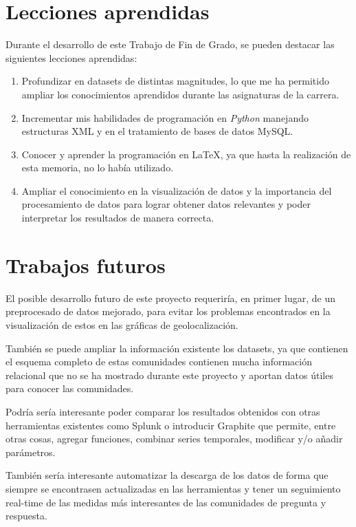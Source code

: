 \documentclass[a4paper, 12pt]{book}
\begin{document}
\section{Lecciones aprendidas}
\label{sec:lecciones_aprendidas}

Durante el desarrollo de este Trabajo de Fin de Grado, se pueden destacar las siguientes lecciones aprendidas:

\begin{enumerate}
  \item Profundizar en datasets de distintas magnitudes, lo que me ha permitido ampliar los conocimientos aprendidos durante las asignaturas de la carrera.
  \item Incrementar mis habilidades de programación en \emph{Python} manejando estructuras XML y en el tratamiento de bases de datos MySQL.
  \item Conocer y aprender la programación en \LaTeX, ya que hasta la realización de esta memoria, no lo había utilizado.
  \item Ampliar el conocimiento en la visualización de datos y la importancia del procesamiento de datos para lograr obtener datos relevantes y poder interpretar los resultados de manera correcta. 
\end{enumerate}


\section{Trabajos futuros}
\label{sec:trabajos_futuros}
El posible desarrollo futuro de este proyecto requeriría, en primer lugar, de un preprocesado de datos mejorado, para evitar los problemas encontrados en la visualización de estos en las gráficas de geolocalización. 

También se puede ampliar la información existente los datasets, ya que contienen el esquema completo de estas comunidades contienen mucha información relacional que no se ha mostrado durante este proyecto y aportan datos útiles para conocer las comunidades.

Podría sería interesante poder comparar los resultados obtenidos con otras herramientas existentes como Splunk o introducir Graphite que permite, entre otras cosas, agregar funciones, combinar series temporales, modificar y/o añadir parámetros.

También sería interesante automatizar la descarga de los datos de forma que siempre se encontrasen actualizadas en las herramientas y tener un seguimiento real-time de las medidas más interesantes de las comunidades de pregunta y respuesta.
\end{document}
